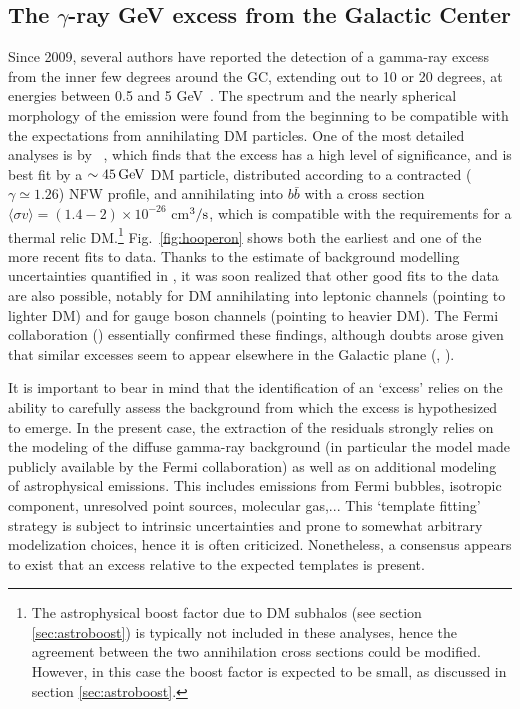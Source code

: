 \subsection{The $\gamma$-ray GeV excess from the Galactic Center}\label{sec:GCGeVexcess}
Since 2009, several authors have reported the detection of a gamma-ray excess from the inner few degrees around the GC, extending out to 10 or 20 degrees, at energies between 0.5 and 5 GeV~\cite{GeVGCexcess}. 
The spectrum and the nearly spherical morphology of the emission were found from the beginning to be compatible with the expectations from annihilating DM particles.
 One of the most detailed analyses is by 
 ~\cite{GeVGCexcess}, which finds that 
  the excess has a high level of significance, and is 
best fit by a $\sim 45\,{\rm GeV}$ DM particle, distributed 
according to a contracted ($\gamma \simeq 1.26$) NFW profile, and annihilating into $b\bar{b}$ with 
a cross section $\langle \sigma v\rangle = (1.4 - 2) \times 10^{-26}$ cm$^3/{\rm s}$, 
which is compatible with the requirements for 
a thermal relic DM.\footnote{The astrophysical boost factor due to DM subhalos (see section \ref{sec:astroboost}) is typically not included in these analyses, hence the agreement between the two annihilation cross sections could be modified. However, in this case the boost factor is expected to be small, as discussed in section \ref{sec:astroboost}.
}
Fig.~\ref{fig:hooperon} shows both the earliest and one of the more recent fits to data. 
Thanks to the estimate of background modelling uncertainties quantified in , it was soon realized that other good fits to the data are also possible, notably for DM annihilating into leptonic channels (pointing to lighter DM) and for gauge boson channels (pointing to heavier DM). 
The {\sc Fermi} collaboration  () essentially confirmed these findings, 
although doubts arose  given that similar excesses seem to appear elsewhere in the Galactic plane (, ).

\medskip

It is important to bear in mind that  the identification of an `excess' 
 relies on the ability to carefully assess the background from  which the excess is hypothesized  to emerge. 
In the present case, the extraction of the residuals strongly relies on the modeling of the diffuse gamma-ray background (in particular the model made publicly available by the {\sc Fermi} collaboration)  as well as on additional modeling of astrophysical emissions. 
This includes emissions from {\sc Fermi} bubbles, isotropic component, unresolved point sources, molecular gas,... 
This `template fitting' strategy is subject to intrinsic uncertainties and prone to somewhat arbitrary modelization choices, hence it is often criticized.
Nonetheless, a consensus appears to exist that an excess relative to the expected templates is present.


